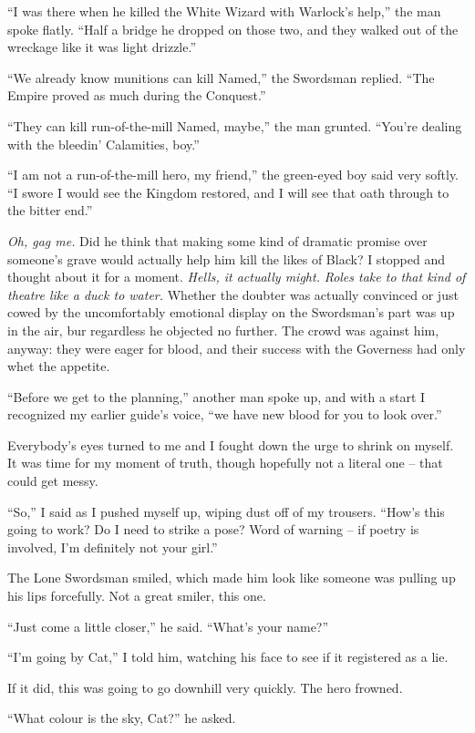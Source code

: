 \documentclass[12pt, openany]{book}
\begin{document}
“I was there when he killed the White Wizard with Warlock’s help,” the man spoke flatly. “Half a bridge he dropped on those two, and they walked out of the wreckage like it was light drizzle.”

“We already know munitions can kill Named,” the Swordsman replied. “The Empire proved as much during the Conquest.”

“They can kill run-of-the-mill Named, maybe,” the man grunted. “You’re dealing with the bleedin’ Calamities, boy.”

“I am not a run-of-the-mill hero, my friend,” the green-eyed boy said very softly. “I swore I would see the Kingdom restored, and I will see that oath through to the bitter end.”

\textit{Oh, gag me.} Did he think that making some kind of dramatic promise over someone’s grave would actually help him kill the likes of Black? I stopped and thought about it for a moment. \textit{Hells, it actually might.} \textit{Roles take to that kind of theatre like a duck to water. }Whether the doubter was actually convinced or just cowed by the uncomfortably emotional display on the Swordsman’s part was up in the air, bur regardless he objected no further. The crowd was against him, anyway: they were eager for blood, and their success with the Governess had only whet the appetite.

“Before we get to the planning,” another man spoke up, and with a start I recognized my earlier guide’s voice, “we have new blood for you to look over.”

Everybody’s eyes turned to me and I fought down the urge to shrink on myself. It was time for my moment of truth, though hopefully not a literal one – that could get messy.

“So,” I said as I pushed myself up, wiping dust off of my trousers. “How’s this going to work? Do I need to strike a pose? Word of warning – if poetry is involved, I’m definitely not your girl.”

The Lone Swordsman smiled, which made him look like someone was pulling up his lips forcefully. Not a great smiler, this one.

“Just come a little closer,” he said. “What’s your name?”

“I’m going by Cat,” I told him, watching his face to see if it registered as a lie.

If it did, this was going to go downhill very quickly. The hero frowned.

“What colour is the sky, Cat?” he asked.
\end{document}
